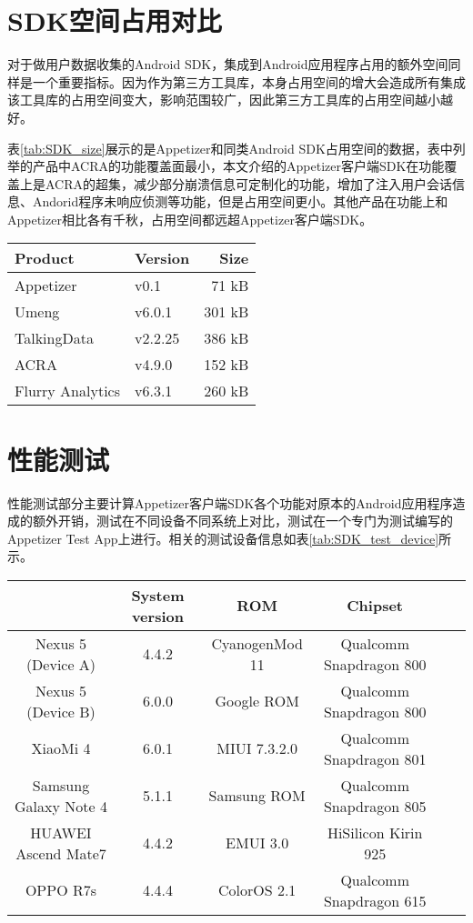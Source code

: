 \section{SDK空间占用对比}
\label{sec:SDK_size_compare}

对于做用户数据收集的Android SDK，集成到Android应用程序占用的额外空间同样是一个重要指标。因为作为第三方工具库，本身占用空间的增大会造成所有集成该工具库的占用空间变大，影响范围较广，因此第三方工具库的占用空间越小越好。

表\ref{tab:SDK_size}展示的是Appetizer和同类Android SDK占用空间的数据，表中列举的产品中ACRA的功能覆盖面最小，本文介绍的Appetizer客户端SDK在功能覆盖上是ACRA的超集，减少部分崩溃信息可定制化的功能，增加了注入用户会话信息、Andorid程序未响应侦测等功能，但是占用空间更小。其他产品在功能上和Appetizer相比各有千秋，占用空间都远超Appetizer客户端SDK。

\begin{table}[!hpb]
	\centering
	\begin{tabular}{@{}llr@{}} \toprule
		Product & Version &Size \\ \midrule
		Appetizer &v0.1& 71 kB \\
		Umeng&v6.0.1& 301 kB \\
		TalkingData&v2.2.25& 386 kB \\
		ACRA&v4.9.0& 152 kB \\
		Flurry Analytics&v6.3.1& 260 kB \\ \bottomrule
	\end{tabular}
\end{table}

\section{性能测试}
\label{sec:perfor_test}

性能测试部分主要计算Appetizer客户端SDK各个功能对原本的Android应用程序造成的额外开销，测试在不同设备不同系统上对比，测试在一个专门为测试编写的Appetizer Test App上进行。相关的测试设备信息如表\ref{tab:SDK_test_device}所示。

\begin{table}[!hpb]
	\centering
	\begin{tabular}{c c c c c c} \toprule
		& System version & ROM & Chipset \\ \midrule
		Nexus 5 (Device A) & 4.4.2 & CyanogenMod 11 & Qualcomm Snapdragon 800 \\
		Nexus 5 (Device B) & 6.0.0 & Google ROM & Qualcomm Snapdragon 800 \\
		XiaoMi 4 & 6.0.1 & MIUI 7.3.2.0  & Qualcomm Snapdragon 801 \\
		Samsung Galaxy Note 4 & 5.1.1 & Samsung ROM & Qualcomm Snapdragon 805 \\
		HUAWEI Ascend Mate7 & 4.4.2 & EMUI 3.0 & HiSilicon Kirin 925 \\
		OPPO R7s & 4.4.4 & ColorOS 2.1 & Qualcomm Snapdragon 615 \\ \bottomrule
	\end{tabular}
\end{table}

